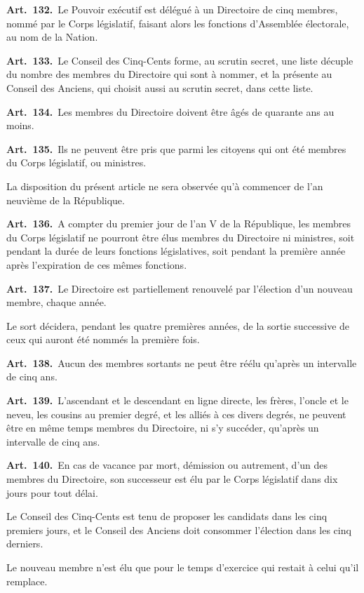 \documentclass[french,twoside]{book} %
\newcommand{\labelchar}[1]{\textbf{\color{rubric} #1}}
\begin{document}
\labelchar{Art. 132.} Le Pouvoir exécutif est délégué à un Directoire de cinq membres, nommé par le Corps législatif, faisant alors les fonctions d’Assemblée électorale, au nom de la Nation.\par
\labelchar{Art. 133.} Le Conseil des Cinq-Cents forme, au scrutin secret, une liste décuple du nombre des membres du Directoire qui sont à nommer, et la présente au Conseil des Anciens, qui choisit aussi au scrutin secret, dans cette liste.\par
\labelchar{Art. 134.} Les membres du Directoire doivent être âgés de quarante ans au moins.\par
\labelchar{Art. 135.} Ils ne peuvent être pris que parmi les citoyens qui ont été membres du Corps législatif, ou ministres.\par
La disposition du présent article ne sera observée qu’à commencer de l’an neuvième de la République.\par
\labelchar{Art. 136.} A compter du premier jour de l’an V de la République, les membres du Corps législatif ne pourront être élus membres du Directoire ni ministres, soit pendant la durée de leurs fonctions législatives, soit pendant la première année après l’expiration de ces mêmes fonctions.\par
\labelchar{Art. 137.} Le Directoire est partiellement renouvelé par l’élection d’un nouveau membre, chaque année.\par
Le sort décidera, pendant les quatre premières années, de la sortie successive de ceux qui auront été nommés la première fois.\par
\labelchar{Art. 138.} Aucun des membres sortants ne peut être réélu qu’après un intervalle de cinq ans.\par
\labelchar{Art. 139.} L’ascendant et le descendant en ligne directe, les frères, l’oncle et le neveu, les cousins au premier degré, et les alliés à ces divers degrés, ne peuvent être en même temps membres du Directoire, ni s’y succéder, qu’après un intervalle de cinq ans.\par
\labelchar{Art. 140.} En cas de vacance par mort, démission ou autrement, d’un des membres du Directoire, son successeur est élu par le Corps législatif dans dix jours pour tout délai.\par
Le Conseil des Cinq-Cents est tenu de proposer les candidats dans les cinq premiers jours, et le Conseil des Anciens doit consommer l’élection dans les cinq derniers.\par
Le nouveau membre n’est élu que pour le temps d’exercice qui restait à celui qu’il remplace.\par
\end{document}

